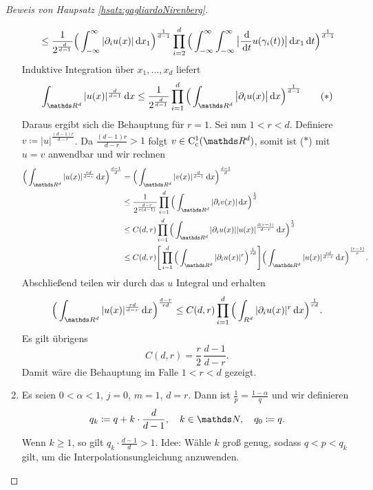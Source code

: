 \begin{proof}[Beweis von Haupsatz \ref{hsatz:gagliardoNirenberg}]
\begin{enumerate}
\begin{align*}
      &\quad \leq \frac{1}{2^{\frac{d}{d - 1}}} \Big( \int_{-\infty}^\infty |\partial_i u(x)| \, {\operatorname{d}\!{x}}_1 \Big)^{\frac{1}{d - 1}} \prod_{i = 2}^d \Big(\int_{-\infty}^\infty \int_{-\infty}^\infty \big| \frac{\, {\operatorname{d}\!{}}}{\, {\operatorname{d}\!{t}}} u(\gamma_i(t)) \big| \, {\operatorname{d}\!{x}}_1 \, {\operatorname{d}\!{t}} \Big)^{\frac{1}{d - 1}}
      \end{align*}
      Induktive Integration über $x_1,\dots,x_d$ liefert
      \begin{align*}
        \int_{\R^d} |u(x)|^{\frac{d}{d - 1}} \d x \leq \frac{1}{2^{\frac{d}{d - 1}}} \prod_{i = 1}^d \Big( \int_{\R^d} \big|\partial_i u(x) \big| \d x \Big)^{\frac{1}{d - 1}} \tag{$\ast$}
      \end{align*}
      Daraus ergibt sich die Behauptung für $r = 1$.
      Sei nun $1 < r < d$. 
      Definiere $v \coloneqq |u|^{\frac{(d - 1) r}{d - r}}$.
      Da $\frac{(d - 1)r}{d - r} > 1$ folgt $v \in \CC_{\mathrm{c}}^1(\R^d)$, somit ist ($\ast$) mit $u = v$ anwendbar und wir rechnen
      \begin{align*}
        \Big( \int_{\R^d} |u(x)|^{\frac{rd}{d - r}} \d x \Big)^{\frac{d - 1}{d} }
       &= \Big( \int_{\R^d} |v(x)|^{\frac{d}{d - 1}} \d x \Big)^{ \frac{d - 1}{d}} \\
        &\leq \frac{1}{2^{\frac{d - r}{r(d - 1)}}} \prod_{i = 1}^d \Big( \int_{\R^d} |\partial_i v(x) | \d x \Big)^{\frac{1}{d}} \\
        &\leq C(d,r) \prod_{i = 1}^d \Big( \int_{\R^d} |\partial_i u(x)| |u(x)|^{\frac{d (r - 1)}{d - r}} \d x \Big)^{\frac{1}{d}} \\
        &\leq C(d,r) \Bigg[ \prod_{i = 1}^d \Big( \int_{\R^d} |\partial_i u(x)|^r \Big)^{\frac{1}{r d}} \Bigg] \Big( \int_{\R^d} |u(x)|^{\frac{rd}{d - r}} \d x \Big)^{\frac{(r - 1)}{r}}.
      \end{align*}
      Abschließend teilen wir durch das $u$ Integral und erhalten
      $$
      \Big( \int_{\R^d} |u(x)|^{\frac{rd}{d - r}} \d x \Big)^{\frac{d - r}{rd}} \leq C(d,r) \prod_{i = 1}^d \Big( \int_{R^d} |\partial_i u(x)|^r \d x \Big)^{\frac{1}{rd}}.
      $$
      Es gilt übrigens
      $$
      C(d,r) = \frac{r}{2} \, \frac{d - 1}{d - r}.
      $$
      Damit wäre die Behauptung im Falle $1 < r < d$ gezeigt.
    \item 
      Es seien $0 < \alpha < 1$, $j = 0$, $m = 1$, $d = r$.
      Dann ist $ \frac{1}{p} = \frac{1 - \alpha}{q} $ und wir definieren
      $$
      q_k \coloneqq q + k \cdot \frac{d}{d - 1}, \quad k \in \N, \quad q_0 \coloneqq q.
      $$
      Wenn $k \geq 1$, so gilt $q_k \cdot \frac{d - 1}{d} > 1$.
      Idee: Wähle $k$ groß genug, sodass $q < p < q_k$ gilt, um die Interpolationsungleichung anzuwenden.

\end{enumerate}
\end{proof}
